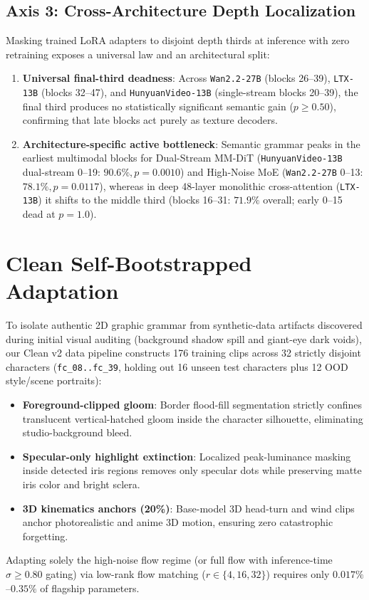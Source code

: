 \documentclass[10pt,twocolumn,letterpaper]{article}
\begin{document}
\subsection{Axis 3: Cross-Architecture Depth Localization}
Masking trained LoRA adapters to disjoint depth thirds at inference with zero retraining exposes a universal law and an architectural split:
\begin{enumerate}
    \item \textbf{Universal final-third deadness}: Across \texttt{Wan2.2-27B} (blocks 26--39), \texttt{LTX-13B} (blocks 32--47), and \texttt{HunyuanVideo-13B} (single-stream blocks 20--39), the final third produces no statistically significant semantic gain ($p \ge 0.50$), confirming that late blocks act purely as texture decoders.
    \item \textbf{Architecture-specific active bottleneck}: Semantic grammar peaks in the earliest multimodal blocks for Dual-Stream MM-DiT (\texttt{HunyuanVideo-13B} dual-stream 0--19: $90.6\%, p=0.0010$) and High-Noise MoE (\texttt{Wan2.2-27B} 0--13: $78.1\%, p=0.0117$), whereas in deep 48-layer monolithic cross-attention (\texttt{LTX-13B}) it shifts to the middle third (blocks 16--31: $71.9\%$ overall; early 0--15 dead at $p=1.0$).
\end{enumerate}

\section{Clean Self-Bootstrapped Adaptation}
To isolate authentic 2D graphic grammar from synthetic-data artifacts discovered during initial visual auditing (background shadow spill and giant-eye dark voids), our Clean v2 data pipeline constructs 176 training clips across 32 strictly disjoint characters (\texttt{fc\_08..fc\_39}, holding out 16 unseen test characters plus 12 OOD style/scene portraits):
\begin{itemize}
    \item \textbf{Foreground-clipped gloom}: Border flood-fill segmentation strictly confines translucent vertical-hatched gloom inside the character silhouette, eliminating studio-background bleed.
    \item \textbf{Specular-only highlight extinction}: Localized peak-luminance masking inside detected iris regions removes only specular dots while preserving matte iris color and bright sclera.
    \item \textbf{3D kinematics anchors (20\%)}: Base-model 3D head-turn and wind clips anchor photorealistic and anime 3D motion, ensuring zero catastrophic forgetting.
\end{itemize}
Adapting solely the high-noise flow regime (or full flow with inference-time $\sigma \ge 0.80$ gating) via low-rank flow matching ($r \in \{4, 16, 32\}$) requires only $0.017\%$--$0.35\%$ of flagship parameters.

\end{document}
